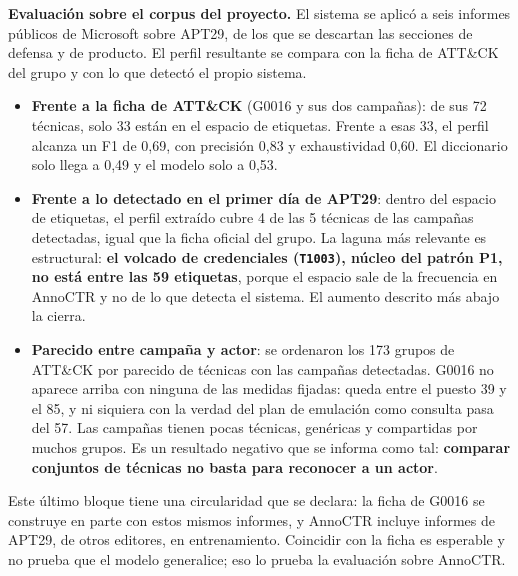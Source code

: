 \medskip\noindent\textbf{Evaluación sobre el corpus del proyecto.} El sistema se aplicó a seis informes públicos
de Microsoft sobre APT29, de los que se descartan las secciones de defensa y de producto. El perfil
resultante se compara con la ficha de ATT\&CK del grupo y con lo que detectó el propio sistema.

\begin{itemize}
    \item \textbf{Frente a la ficha de ATT\&CK} (G0016 y sus dos campañas): de sus 72 técnicas,
    solo 33 están en el espacio de etiquetas. Frente a esas 33, el perfil alcanza un F1 de 0,69,
    con precisión 0,83 y exhaustividad 0,60. El diccionario solo llega a 0,49 y el modelo solo a
    0,53.
    \item \textbf{Frente a lo detectado en el primer día de APT29}: dentro del espacio de etiquetas,
    el perfil extraído cubre 4 de las 5 técnicas de las campañas detectadas, igual que la ficha
    oficial del grupo. La laguna más relevante es estructural: \textbf{el volcado de credenciales
    (\texttt{T1003}), núcleo del patrón P1, no está entre las 59 etiquetas}, porque el espacio sale
    de la frecuencia en AnnoCTR y no de lo que detecta el sistema. El aumento descrito más abajo
    la cierra.
    \item \textbf{Parecido entre campaña y actor}: se ordenaron los 173 grupos de ATT\&CK por parecido
    de técnicas con las campañas detectadas. G0016 no aparece arriba con ninguna de las medidas
    fijadas: queda entre el puesto 39 y el 85, y ni siquiera con la verdad del plan de emulación
    como consulta pasa del 57. Las campañas tienen pocas técnicas, genéricas y compartidas por
    muchos grupos. Es un resultado negativo que se informa como tal: \textbf{comparar conjuntos de
    técnicas no basta para reconocer a un actor}.
\end{itemize}

Este último bloque tiene una circularidad que se declara: la ficha de G0016 se construye en parte
con estos mismos informes, y AnnoCTR incluye informes de APT29, de otros editores, en
entrenamiento. Coincidir con la ficha es esperable y no prueba que el modelo generalice; eso lo
prueba la evaluación sobre AnnoCTR.


